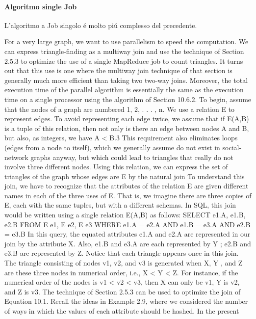 \documentclass[paper=a4, fontsize=11pt]{scrartcl}	%
\numberwithin{equation}{section}															%
\numberwithin{figure}{section}																%
\numberwithin{table}{section}																%
\begin{document}
\paragraph{Algoritmo single Job}
L'algoritmo a Job singolo \'e molto pi\'u complesso del precedente.

For a very large graph, we want to use parallelism to speed the computation.
We can express triangle-finding as a multiway join and use the technique of
Section 2.5.3 to optimize the use of a single MapReduce job to count triangles.
It turns out that this use is one where the multiway join technique of that section
is generally much more efficient than taking two two-way joins. Moreover, the
total execution time of the parallel algorithm is essentially the same as the
execution time on a single processor using the algorithm of Section 10.6.2.
To begin, assume that the nodes of a graph are numbered 1, 2, . . . , n. We
use a relation E to represent edges. To avoid representing each edge twice,
we assume that if E(A,B) is a tuple of this relation, then not only is there
an edge between nodes A and B, but also, as integers, we have A < B.3
This requirement also eliminates loops (edges from a node to itself), which we
generally assume do not exist in social-network graphs anyway, but which could
lead to triangles that really do not involve three different nodes.
Using this relation, we can express the set of triangles of the graph whose
edges are E by the natural join
To understand this join, we have to recognize that the attributes of the relation
E are given different names in each of the three uses of E. That is, we imagine
there are three copies of E, each with the same tuples, but with a different
schemas. In SQL, this join would be written using a single relation E(A,B) as
follows:
SELECT e1.A, e1.B, e2.B
FROM E e1, E e2, E e3
WHERE e1.A = e2.A AND e1.B = e3.A AND e2.B = e3.B
In this query, the equated attributes e1.A and e2.A are represented in our join
by the attribute X. Also, e1.B and e3.A are each represented by Y ; e2.B and
e3.B are represented by Z.
Notice that each triangle appears once in this join. The triangle consisting
of nodes v1, v2, and v3 is generated when X, Y , and Z are these three nodes in
numerical order, i.e., X < Y < Z. For instance, if the numerical order of the
nodes is v1 < v2 < v3, then X can only be v1, Y is v2, and Z is v3.
The technique of Section 2.5.3 can be used to optimize the join of Equation
10.1. Recall the ideas in Example 2.9, where we considered the number
of ways in which the values of each attribute should be hashed. In the present
\end{document}

